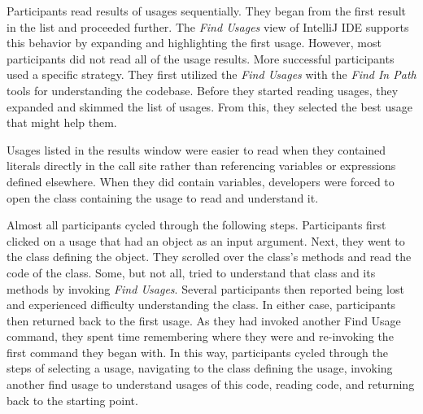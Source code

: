 \documentclass[conference]{IEEEtran}
\begin{document}

Participants read results of usages sequentially. They began from the first result in the list and proceeded further.
The \textit{Find Usages} view of IntelliJ IDE supports this behavior by expanding and highlighting the first usage. 
However, most participants did not read all of the usage results. 
More successful participants used a specific strategy.  They first utilized the \textit{Find Usages} with the \textit{Find In Path} tools for understanding the codebase. Before they started reading usages, they expanded and skimmed the list of usages. From this, they selected the best usage that might help them. \par


Usages listed in the results window were easier to read when they contained literals directly in the call site rather than referencing variables or expressions defined elsewhere. When they did contain variables, developers were forced to open the class containing the usage to read and understand it. \par


Almost all participants cycled through the following steps.
Participants first clicked on a usage that had an object as an input argument. Next, they went to the class defining the object. They scrolled over the class's methods and read the code of the class. Some, but not all, tried to understand that class and its methods by invoking \textit{Find Usages}. Several participants then reported being lost and experienced difficulty understanding the class. In either case, participants then returned back to the first usage. As they had invoked another Find Usage command, they spent time remembering where they were and re-invoking the first command they began with. In this way, participants cycled through the steps of 
selecting a usage, navigating to the class defining the usage, invoking another find usage to understand usages of this code, reading code, and returning back to the starting point. \par
\end{document}
